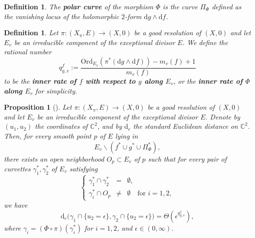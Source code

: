 \documentclass[reqno,dvipsnames,12pt]{amsart}
\renewcommand{\setminus}{\smallsetminus}
\newtheorem{prop}[thm]{Proposition}
\newtheorem{defi}[thm]{Definition}
\begin{document}
\begin{defi}
The \textbf{polar curve} of the morphism $\Phi$ is the curve $\Pi_{\Phi}$ defined as the vanishing locus of the holomorphic $2$-form $\mathrm{d}g \wedge \mathrm{d}f$.
\end{defi}

\begin{defi}\label{inner}
Let $\pi :(X_{\pi},E) \longrightarrow (X,0)$ be a good resolution of $(X,0)$ and let $E_v$ be an irreducible component of the exceptional divisor $E$. We define the rational number
\[
q_{g,v}^f:=\frac{\mathrm{Ord}_{E_v}(\pi^{*}(\mathrm{d}g \wedge \mathrm{d}f))-m_v(f)+1}{m_v(f)}
\]
to be the \textbf{inner rate of $f$ with respect to $g$ along $E_v$}, or  the \textbf{inner rate of $\Phi$ along $E_v$} for simplicity.
\end{defi}

\begin{prop}[{\cite[Proposition 3.2]{yenni1}}]\label{inner-rate}
Let $\pi :(X_{\pi},E) \longrightarrow (X,0)$ be a good resolution of $(X,0)$ and let $E_v$ be an irreducible component of the exceptional divisor $E$. Denote by $(u_1,u_2)$ the coordinates of $\mathbb{C}^2$, and by $\mathrm{d}_e$ the standard Euclidean distance on $\mathbb{C}^2$.
Then, for every smooth point $p$ of $E$ lying in
\[
E_v \setminus (f^* \cup g^* \cup \Pi_{\Phi}^*),
\]
there exists an open neighborhood $O_p \subset E_v$ of $p$ such that for every pair of curvettes $\gamma_{1}^*, \gamma_{2}^*$ of $E_v$ satisfying
\setcounter{equation}{0}
\renewcommand{\theequation}{2.\arabic{equation}}
\begin{equation}\label{cond}
\left\{
\begin{array}{rcl}
\gamma_1^* \cap \gamma_2^* &=& \emptyset, \\
\gamma_i^* \cap O_p &\neq& \emptyset \quad \text{for } i=1,2,
\end{array}
\right.
\end{equation}
we have
\[
\mathrm{d}_e\bigl(\gamma_1 \cap \{u_2 = \epsilon\}, \gamma_2 \cap \{u_2 = \epsilon\}\bigr)
= \Theta(\epsilon^{q_{g,v}^f}),
\]
where $\gamma_i = (\Phi \circ \pi)(\gamma_i^*)$ for $i=1,2$, and $\epsilon \in (0,\infty)$.
\end{prop}
\end{document}
